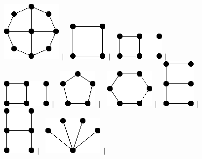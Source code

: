 \documentclass[11pt,paper=b5,footinclude,headinclude]{scrbook} %
\newtheorem{ex}{Vaja\hypertarget{sol:\theex}}[chapter]
\begin{document}
\begin{ex}
\begin{figure}
\includegraphics[scale=0.5]{smallGraphs/g_BW4.png}$\,\mid\,$\
\includegraphics[scale=0.5]{smallGraphs/g_C4.png}$\,\mid\,$\
\includegraphics[scale=0.5]{smallGraphs/g_C4U2K1.png}$\,\mid\,$\
\includegraphics[scale=0.5]{smallGraphs/g_C4UP2.png}$\,\mid\,$\
\includegraphics[scale=0.5]{smallGraphs/g_C5.png}$\,\mid\,$\
\includegraphics[scale=0.5]{smallGraphs/g_C6.png}$\,\mid\,$\
\includegraphics[scale=0.5]{smallGraphs/g_E.png}$\,\mid\,$\
\includegraphics[scale=0.5]{smallGraphs/g_H.png}$\,\mid\,$\
\includegraphics[scale=0.5]{smallGraphs/g_K14.png}$\,\mid\,$\

\end{figure}
\end{ex}
\end{document}
